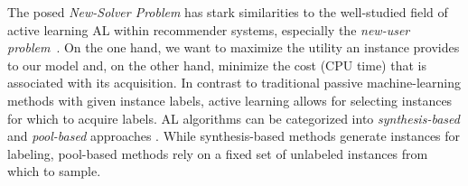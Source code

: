 \documentclass[runningheads]{llncs}
\begin{document}
%  

The posed \emph{New-Solver Problem} has stark similarities to the well-studied field of active learning AL within recommender systems, especially the \emph{new-user problem}~\cite{RubensESK15}.
On the one hand, we want to maximize the utility an instance provides to our model and, on the other hand, minimize the cost (CPU time) that is associated with its acquisition.
In contrast to traditional passive machine-learning methods with given instance labels, active learning allows for selecting instances for which to acquire labels.
AL algorithms can be categorized into \emph{synthesis-bas\-ed} \cite{0001AEMN22,GarzonMG22,2019gaal} and \emph{pool-bas\-ed} approaches \cite{GolbandiKL11,HarpaleY08,KorenBV09}.%
While synthesis-based methods generate instances for labeling, pool-based methods rely on a fixed set of unlabeled instances from which to sample.
\end{document}
